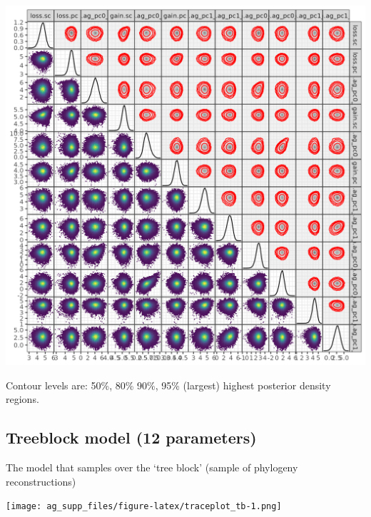 \documentclass[
]{article}
\begin{document}
\includegraphics[width=10.5in]{pix/mcmc_pairs_0}

Contour levels are: 50\%, 80\% 90\%, 95\% (largest) highest posterior
density regions.

\hypertarget{treeblock-model-12-parameters}{%
\subsection{Treeblock model (12
parameters)}\label{treeblock-model-12-parameters}}

The model that samples over the `tree block' (sample of phylogeny
reconstructions)

\texttt{[image: ag\_supp\_files/figure-latex/traceplot\_tb-1.png]}
\end{document}
